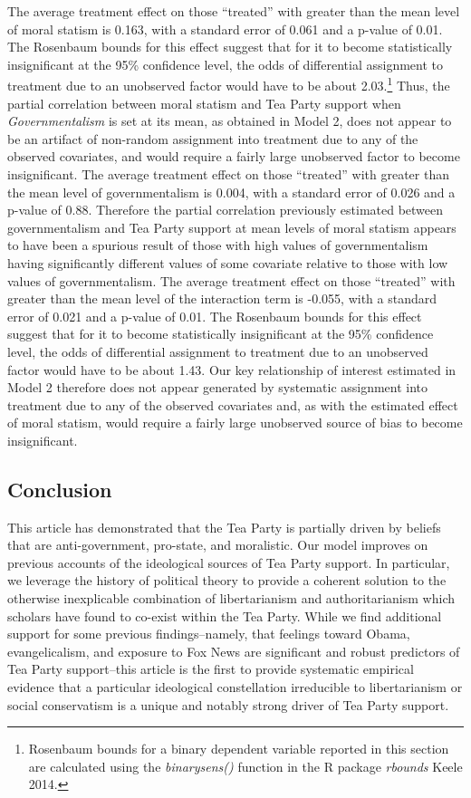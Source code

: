 \documentclass[12pt,]{article}
\begin{document}
The average treatment effect on those ``treated'' with greater than the
mean level of moral statism is 0.163, with a standard error of 0.061 and
a p-value of 0.01. The Rosenbaum bounds for this effect suggest that for
it to become statistically insignificant at the 95\% confidence level,
the odds of differential assignment to treatment due to an unobserved
factor would have to be about 2.03.\footnote{Rosenbaum bounds for a
  binary dependent variable reported in this section are calculated
  using the \emph{binarysens()} function in the R package \emph{rbounds}
  Keele 2014.} Thus, the partial correlation between moral statism and
Tea Party support when \emph{Governmentalism} is set at its mean, as
obtained in Model 2, does not appear to be an artifact of non-random
assignment into treatment due to any of the observed covariates, and
would require a fairly large unobserved factor to become insignificant.
The average treatment effect on those ``treated'' with greater than the
mean level of governmentalism is 0.004, with a standard error of 0.026
and a p-value of 0.88. Therefore the partial correlation previously
estimated between governmentalism and Tea Party support at mean levels
of moral statism appears to have been a spurious result of those with
high values of governmentalism having significantly different values of
some covariate relative to those with low values of governmentalism. The
average treatment effect on those ``treated'' with greater than the mean
level of the interaction term is -0.055, with a standard error of 0.021
and a p-value of 0.01. The Rosenbaum bounds for this effect suggest that
for it to become statistically insignificant at the 95\% confidence
level, the odds of differential assignment to treatment due to an
unobserved factor would have to be about 1.43. Our key relationship of
interest estimated in Model 2 therefore does not appear generated by
systematic assignment into treatment due to any of the observed
covariates and, as with the estimated effect of moral statism, would
require a fairly large unobserved source of bias to become
insignificant.

\subsection{Conclusion}\label{conclusion}

This article has demonstrated that the Tea Party is partially driven by
beliefs that are anti-government, pro-state, and moralistic. Our model
improves on previous accounts of the ideological sources of Tea Party
support. In particular, we leverage the history of political theory to
provide a coherent solution to the otherwise inexplicable combination of
libertarianism and authoritarianism which scholars have found to
co-exist within the Tea Party. While we find additional support for some
previous findings--namely, that feelings toward Obama, evangelicalism,
and exposure to Fox News are significant and robust predictors of Tea
Party support--this article is the first to provide systematic empirical
evidence that a particular ideological constellation irreducible to
libertarianism or social conservatism is a unique and notably strong
driver of Tea Party support.
\end{document}
